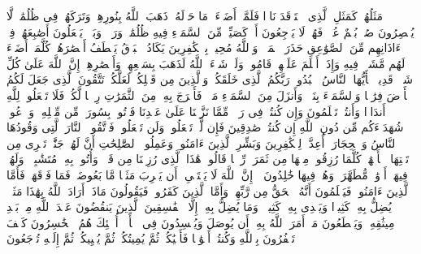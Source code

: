 \stopbuffer%
\startbuffer[\q:2:17]
مَثَلُهُمۡ كَمَثَلِ ٱلَّذِی ٱسۡتَوۡقَدَ نَارࣰا فَلَمَّاۤ أَضَاۤءَتۡ مَا حَوۡلَهُۥ ذَهَبَ ٱللَّهُ بِنُورِهِمۡ وَتَرَكَهُمۡ فِی ظُلُمَٰتࣲ لَّا یُبۡصِرُونَ%
\stopbuffer%
\startbuffer[\q:2:18]
صُمُّۢ بُكۡمٌ عُمۡیࣱ فَهُمۡ لَا یَرۡجِعُونَ%
\stopbuffer%
\startbuffer[\q:2:19]
أَوۡ كَصَیِّبࣲ مِّنَ ٱلسَّمَاۤءِ فِیهِ ظُلُمَٰتࣱ وَرَعۡدࣱ وَبَرۡقࣱ یَجۡعَلُونَ أَصَٰبِعَهُمۡ فِیۤ ءَاذَانِهِم مِّنَ ٱلصَّوَٰعِقِ حَذَرَ ٱلۡمَوۡتِۚ وَٱللَّهُ مُحِیطُۢ بِٱلۡكَٰفِرِینَ%
\stopbuffer%
\startbuffer[\q:2:20]
یَكَادُ ٱلۡبَرۡقُ یَخۡطَفُ أَبۡصَٰرَهُمۡۖ كُلَّمَاۤ أَضَاۤءَ لَهُم مَّشَوۡا۟ فِیهِ وَإِذَاۤ أَظۡلَمَ عَلَیۡهِمۡ قَامُوا۟ۚ وَلَوۡ شَاۤءَ ٱللَّهُ لَذَهَبَ بِسَمۡعِهِمۡ وَأَبۡصَٰرِهِمۡۚ إِنَّ ٱللَّهَ عَلَىٰ كُلِّ شَیۡءࣲ قَدِیرࣱ%
\stopbuffer%
\startbuffer[\q:2:21]
یَٰۤأَیُّهَا ٱلنَّاسُ ٱعۡبُدُوا۟ رَبَّكُمُ ٱلَّذِی خَلَقَكُمۡ وَٱلَّذِینَ مِن قَبۡلِكُمۡ لَعَلَّكُمۡ تَتَّقُونَ%
\stopbuffer%
\startbuffer[\q:2:22]
ٱلَّذِی جَعَلَ لَكُمُ ٱلۡأَرۡضَ فِرَٰشࣰا وَٱلسَّمَاۤءَ بِنَاۤءࣰ وَأَنزَلَ مِنَ ٱلسَّمَاۤءِ مَاۤءࣰ فَأَخۡرَجَ بِهِۦ مِنَ ٱلثَّمَرَٰتِ رِزۡقࣰا لَّكُمۡۖ فَلَا تَجۡعَلُوا۟ لِلَّهِ أَندَادࣰا وَأَنتُمۡ تَعۡلَمُونَ%
\stopbuffer%
\startbuffer[\q:2:23]
وَإِن كُنتُمۡ فِی رَیۡبࣲ مِّمَّا نَزَّلۡنَا عَلَىٰ عَبۡدِنَا فَأۡتُوا۟ بِسُورَةࣲ مِّن مِّثۡلِهِۦ وَٱدۡعُوا۟ شُهَدَاۤءَكُم مِّن دُونِ ٱللَّهِ إِن كُنتُمۡ صَٰدِقِینَ%
\stopbuffer%
\startbuffer[\q:2:24]
فَإِن لَّمۡ تَفۡعَلُوا۟ وَلَن تَفۡعَلُوا۟ فَٱتَّقُوا۟ ٱلنَّارَ ٱلَّتِی وَقُودُهَا ٱلنَّاسُ وَٱلۡحِجَارَةُۖ أُعِدَّتۡ لِلۡكَٰفِرِینَ%
\stopbuffer%
\startbuffer[\q:2:25]
وَبَشِّرِ ٱلَّذِینَ ءَامَنُوا۟ وَعَمِلُوا۟ ٱلصَّٰلِحَٰتِ أَنَّ لَهُمۡ جَنَّٰتࣲ تَجۡرِی مِن تَحۡتِهَا ٱلۡأَنۡهَٰرُۖ كُلَّمَا رُزِقُوا۟ مِنۡهَا مِن ثَمَرَةࣲ رِّزۡقࣰا قَالُوا۟ هَٰذَا ٱلَّذِی رُزِقۡنَا مِن قَبۡلُۖ وَأُتُوا۟ بِهِۦ مُتَشَٰبِهࣰاۖ وَلَهُمۡ فِیهَاۤ أَزۡوَٰجࣱ مُّطَهَّرَةࣱۖ وَهُمۡ فِیهَا خَٰلِدُونَ%
\stopbuffer%
\startbuffer[\q:2:26]
۞ إِنَّ ٱللَّهَ لَا یَسۡتَحۡیِۦۤ أَن یَضۡرِبَ مَثَلࣰا مَّا بَعُوضَةࣰ فَمَا فَوۡقَهَاۚ فَأَمَّا ٱلَّذِینَ ءَامَنُوا۟ فَیَعۡلَمُونَ أَنَّهُ ٱلۡحَقُّ مِن رَّبِّهِمۡۖ وَأَمَّا ٱلَّذِینَ كَفَرُوا۟ فَیَقُولُونَ مَاذَاۤ أَرَادَ ٱللَّهُ بِهَٰذَا مَثَلࣰاۘ یُضِلُّ بِهِۦ كَثِیرࣰا وَیَهۡدِی بِهِۦ كَثِیرࣰاۚ وَمَا یُضِلُّ بِهِۦۤ إِلَّا ٱلۡفَٰسِقِینَ%
\stopbuffer%
\startbuffer[\q:2:27]
ٱلَّذِینَ یَنقُضُونَ عَهۡدَ ٱللَّهِ مِنۢ بَعۡدِ مِیثَٰقِهِۦ وَیَقۡطَعُونَ مَاۤ أَمَرَ ٱللَّهُ بِهِۦۤ أَن یُوصَلَ وَیُفۡسِدُونَ فِی ٱلۡأَرۡضِۚ أُو۟لَٰۤئِكَ هُمُ ٱلۡخَٰسِرُونَ%
\stopbuffer%
\startbuffer[\q:2:28]
كَیۡفَ تَكۡفُرُونَ بِٱللَّهِ وَكُنتُمۡ أَمۡوَٰتࣰا فَأَحۡیَٰكُمۡۖ ثُمَّ یُمِیتُكُمۡ ثُمَّ یُحۡیِیكُمۡ ثُمَّ إِلَیۡهِ تُرۡجَعُونَ%
\stopbuffer%
